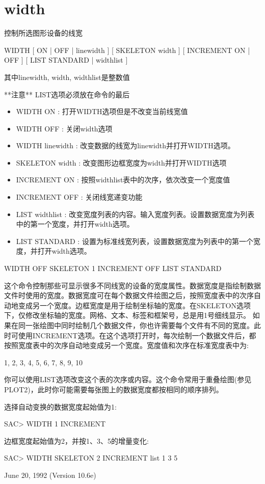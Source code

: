 \section{width}
\label{cmd:width}

控制所选图形设备的线宽

WIDTH  [ ON | OFF | linewidth ] [ SKELETON width ] [ INCREMENT ON | OFF ] [ LIST STANDARD | widthlist ]

其中linewidth, width, widthlist是整数值

**注意** LIST选项必须放在命令的最后

\begin{itemize}
\item WIDTH ON : 打开WIDTH选项但是不改变当前线宽值 
\item WIDTH OFF : 关闭width选项 
\item WIDTH linewidth : 改变数据的线宽为linewidth并打开WIDTH选项。 
\item SKELETON width : 改变图形边框宽度为width并打开WIDTH选项 
\item INCREMENT {ON} : 按照widthlist表中的次序，依次改变一个宽度值 
\item INCREMENT OFF : 关闭线宽递变功能 
\item LIST widthlist : 改变宽度列表的内容。输入宽度列表。设置数据宽度为列表中的第一个宽度，并打开width选项。 
\item LIST STANDARD : 设置为标准线宽列表，设置数据宽度为列表中的第一个宽度，并打开width选项。 
\end{itemize}

WIDTH OFF SKELETON 1 INCREMENT OFF LIST STANDARD

这个命令控制那些可显示很多不同线宽的设备的宽度属性。数据宽度是指绘制数据文件时使用的宽度。数据宽度可在每个数据文件绘图之后，按照宽度表中的次序自动地变成另一个宽度。边框宽度是用于绘制坐标轴的宽度。在SKELETON选项下，仅修改坐标轴的宽度。网格、文本、标签和框架号，总是用1号细线显示。
如果在同一张绘图中同时绘制几个数据文件，你也许需要每个文件有不同的宽度。此时可使用INCREMENT选项。在这个选项打开时，每次绘制一个数据文件后，都按照宽度表中的次序自动地变成另一个宽度。宽度值和次序在标准宽度表中为:
\begin{SACCode}
1, 2, 3, 4, 5, 6, 7, 8, 9, 10
\end{SACCode}
你可以使用LIST选项改变这个表的次序或内容。这个命令常用于重叠绘图(参见PLOT2)，此时你可能需要每张图上的数据宽度都按相同的顺序排列。

选择自动变换的数据宽度起始值为1:
\begin{SACCode}
SAC> WIDTH 1 INCREMENT
\end{SACCode}

边框宽度起始值为2，并按1、3、5的增量变化:
\begin{SACCode}
SAC> WIDTH SKELETON 2 INCREMENT list 1 3 5
\end{SACCode}

June 20, 1992 (Version 10.6e)

